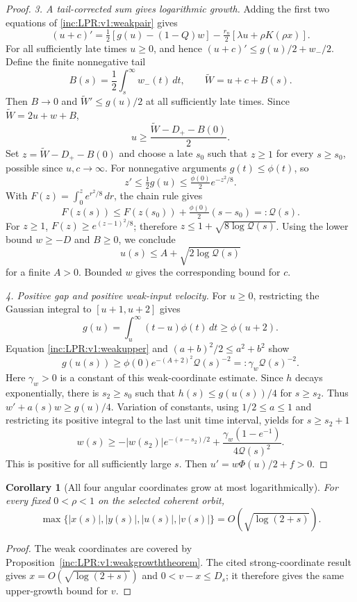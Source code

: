 \documentclass[11pt]{article}
\numberwithin{equation}{section}
\newtheorem{corollary}[theorem]{Corollary}
\theoremstyle{remark}\newtheorem{remark}[theorem]{Remark}
\newcommand{\dd}{\,d}
\begin{document}
\begin{proof}
\emph{3. A tail-corrected sum gives logarithmic growth.}
Adding the first two equations of \eqref{inc:LPR:v1:weakpair} gives
\[
 (u+c)'=\tfrac12[g(u)-(1-Q)w]
       -\tfrac{r_n}{2}[\lambda u+\rho K(\rho x)].
\]
For all sufficiently late times $u\ge0$, and hence
$(u+c)'\le g(u)/2+w_-/2$.
Define the finite nonnegative tail
\[
 B(s)=\frac12\int_s^\infty w_-(t)\dd t,\qquad
 \widetilde W=u+c+B(s).
\]
Then $B\to0$ and $\widetilde W'\le g(u)/2$ at all sufficiently late
times. Since $\widetilde W=2u+w+B$,
\[
 u\ge\frac{\widetilde W-D_+-B(0)}2.
\]
Set $z=\widetilde W-D_+-B(0)$ and choose a late $s_0$ such that
$z\ge1$ for every $s\ge s_0$, possible since $u,c\to\infty$.
For nonnegative arguments $g(t)\le\phi(t)$, so
\[
 z'\le\tfrac12g(u)\le\tfrac{\phi(0)}2e^{-z^2/8}.
\]
With $F(z)=\int_0^z e^{r^2/8}\dd r$, the chain rule gives
\[
 F(z(s))\le F(z(s_0))+\tfrac{\phi(0)}2(s-s_0)=:\mathcal Q(s).
\]
For $z\ge1$, $F(z)\ge e^{(z-1)^2/8}$; therefore
$z\le1+\sqrt{8\log\mathcal Q(s)}$.
Using the lower bound $w\ge-D$ and $B\ge0$, we conclude
\begin{equation}\label{inc:LPR:v1:weakupper}
 u(s)\le A+\sqrt{2\log\mathcal Q(s)}
\end{equation}
for a finite $A>0$. Bounded $w$ gives the corresponding bound for $c$.

\emph{4. Positive gap and positive weak-input velocity.}
For $u\ge0$, restricting the Gaussian integral to $[u+1,u+2]$ gives
\[
 g(u)=\int_u^\infty(t-u)\phi(t)\dd t\ge\phi(u+2).
\]
Equation \eqref{inc:LPR:v1:weakupper} and
$(a+b)^2/2\le a^2+b^2$ show
\[
 g(u(s))\ge\phi(0)e^{-(A+2)^2}\mathcal Q(s)^{-2}
 =:\gamma_w\mathcal Q(s)^{-2}.
\]
Here $\gamma_w>0$ is a constant of this weak-coordinate estimate.
Since $h$ decays exponentially, there is $s_2\ge s_0$ such that
$h(s)\le g(u(s))/4$ for $s\ge s_2$. Thus
$w'+a(s)w\ge g(u)/4$.
Variation of constants, using $1/2\le a\le1$ and restricting its positive
integral to the last unit time interval, yields for $s\ge s_2+1$
\[
 w(s)\ge-|w(s_2)|e^{-(s-s_2)/2}
       +\frac{\gamma_w(1-e^{-1})}{4\mathcal Q(s)^2}.
\]
This is positive for all sufficiently large $s$. Then
$u'=w\Phi(u)/2+f>0$.
\end{proof}

\begin{corollary}[All four angular coordinates grow at most logarithmically]
\label{inc:LPR:v1:allgrowth}
For every fixed $0<\rho<1$ on the selected coherent orbit,
\[
 \max\{|x(s)|,|y(s)|,|u(s)|,|v(s)|\}
 =O(\sqrt{\log(2+s)}).
\]
\end{corollary}
\begin{proof}
The weak coordinates are covered by
Proposition~\ref{inc:LPR:v1:weakgrowththeorem}. The cited strong-coordinate
result gives $x=O(\sqrt{\log(2+s)})$ and $0<v-x\le D_s$; it therefore gives
the same upper-growth bound for $v$.
\end{proof}
\end{document}
